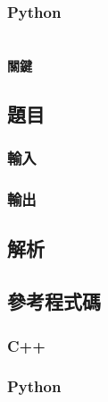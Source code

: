 \documentclass[a4paper,10pt]{article}
\begin{document}
%

\subsubsection{Python}

%

\section{}

\paragraph{關鍵}

\subsection{題目}



\subsubsection{輸入}



\subsubsection{輸出}



\subsection{解析}



\subsection{參考程式碼}

\subsubsection{C++}

%

\subsubsection{Python}
\end{document}
